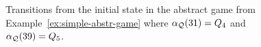 \begin{itemize}
%
%
%
\end{itemize}

\begin{figure}

\caption{Transitions from the initial state in the abstract game from Example~\ref{ex:simple-abstr-game} where $\alpha_{\mathcal{Q}}(31) = Q_4$ and $\alpha_{\mathcal{Q}}(39) = Q_5$.}
\label{fig:simple-abstr-game}
\end{figure}


